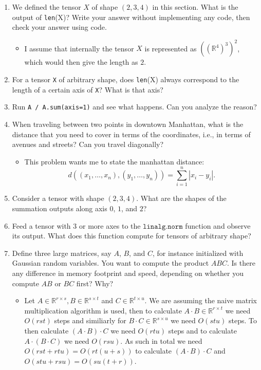 \documentclass{article}
\begin{document}
\begin{enumerate}
    \item We defined the tensor $X$ of shape $(2, 3, 4)$ in this section. What is the output of \texttt{len}(X)? Write your answer without implementing any code, then check your answer using code.
    	\begin{itemize}
    		\item I assume that internally the tensor $X$ is represented as $((\mathbb{R}^4)^3)^2$, which would then give the length as $2$.
    	\end{itemize}

    \item For a tensor \texttt{X} of arbitrary shape, does \texttt{len}(X) always correspond to the length of a certain axis of \texttt{X}? What is that axis?

    \item Run \texttt{A / A.\texttt{sum}(axis=1)} and see what happens. Can you analyze the reason?

    \item When traveling between two points in downtown Manhattan, what is the distance that you need to cover in terms of the coordinates, i.e., in terms of avenues and streets? Can you travel diagonally?
    	\begin{itemize}
    		\item This problem wants me to state the manhattan distance:
    		$$
    		d((x_1, \dots, x_n), (y_1, \dots, y_n)) = \sum_{i = 1}^n |x_i - y_i|.
    		$$
    	\end{itemize}

    \item Consider a tensor with shape $(2, 3, 4)$. What are the shapes of the summation outputs along axis $0$, $1$, and $2$?

    \item Feed a tensor with $3$ or more axes to the $\texttt{linalg.norm}$ function and observe its output. What does this function compute for tensors of arbitrary shape?

    \item Define three large matrices, say $A$, $B$, and $C$, for instance initialized with Gaussian random variables. You want to compute the product $ABC$. Is there any difference in memory footprint and speed, depending on whether you compute $AB$ or $BC$ first? Why?
    \begin{itemize}
    	\item Let $A \in \mathbb{R}^{r \times s}, B \in \mathbb{R}^{s \times t}$ and $C \in \mathbb{R}^{t \times u}$. We are assuming the naive matrix multiplication algorithm is used, then to calculate $A \cdot B \in \mathbb{R}^{r \times t}$ we need $O(rst)$ steps and similiarly for $B \cdot C \in \mathbb{R}^{s \times u}$ we need $O(s t u)$ steps. To then calculate $(A \cdot B) \cdot C$ we need $O(rtu)$ steps and to calculate $A \cdot (B \cdot C)$ we need $O(rsu)$. As such in total we need $O(rst + rtu) = O(rt(u + s))$ to calculate $(A \cdot B) \cdot C$ and $O(stu + rsu) = O(su(t + r))$.
    \end{itemize}


\end{enumerate}
\end{document}
